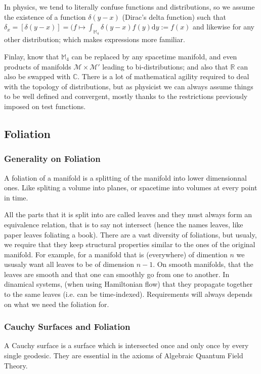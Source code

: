\documentclass[a4paper,11pt]{article}
\numberwithin{equation}{section}
\theoremstyle{definition}
\renewcommand{\d}{{\mathrm{d}}}
\begin{document}
    In physics, we tend to literally confuse functions and distributions, so we assume the existence of a function $\delta(y-x)$ (Dirac's delta function) such that $\delta_x=[\delta(y-x)]=(f\mapsto \int_{\mathbb{M}_4}\delta(y-x)f(y)\d y:=f(x)$ and likewise for any other distribution; which makes expressions more familiar.

    Finlay, know that $\mathbb{M}_4$ can be replaced by any spacetime manifold, and even products of manifolds $\mathcal{M}\times\mathcal{M}'$ leading to bi-distributions; and also that $\mathbb{R}$ can also be swapped with $\mathbb{C}$. There is a lot of mathematical agility required to deal with the topology of distributions, but as physicist we can always assume things to be well defined and convergent, mostly thanks to the restrictions previously imposed on test functions.

\subsection{Foliation}\label{PhyFoli}
    \subsubsection{Generality on Foliation}
    A foliation of a manifold is a splitting of the manifold into lower dimensionnal ones. Like spliting a volume into planes, or spacetime into volumes at every point in time.

    All the parts that it is split into are called leaves and they must always form an equivalence relation, that is to say not intersect (hence the names leaves, like paper leaves foliating a book). There are a vast diversity of foliations, but usualy, we require that they keep structural properties similar to the ones of the original manifold. For example, for a manifold that is (everywhere) of dimention $n$ we ususaly want all leaves to be of dimension $n-1$. On smooth manifolds, that the leaves are smooth and that one can smoothly go from one to another. In dinamical systems, (when using Hamiltonian flow) that they propagate together to the same leaves (i.e. can be time-indexed). Requirements will always depends on what we need the foliation for.

\subsubsection{Cauchy Surfaces and Foliation}\label{CauchyPhy}
    A Cauchy surface is a surface which is intersected once and only once by every single geodesic. They are essential in the axioms of Algebraic Quantum Field Theory.
\end{document}
